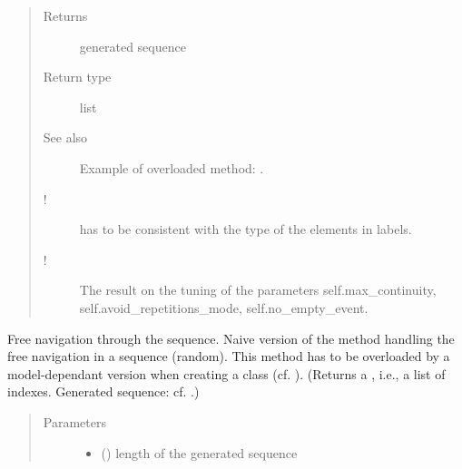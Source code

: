 \documentclass[letterpaper,10pt,english]{sphinxmanual}
\begin{document}
\begin{fulllineitems}
\begin{fulllineitems}
\begin{quote}
\begin{description}
\begin{itemize}
\end{itemize}

\item[{Returns}] \leavevmode
generated sequence

\item[{Return type}] \leavevmode
list

\item[{See also}] \leavevmode
Example of overloaded method: .

\item[{!}] \leavevmode
{} has to be consistent with the type of the elements in labels.

\item[{!}] \leavevmode
The result  on the tuning of the parameters self.max\_continuity, self.avoid\_repetitions\_mode, self.no\_empty\_event.

\end{description}\end{quote}

\end{fulllineitems}


\begin{fulllineitems}
\label{\detokenize{index:Navigator.Navigator.free_navigation}}
Free navigation through the sequence. 
Naive version of the method handling the free navigation in a sequence (random). 
This method has to be overloaded by a model-dependant version when creating a  class (cf. ).
(Returns a , i.e., a list of indexes. Generated sequence: cf. {\hyperref[\detokenize{index:Navigator.Navigator.free_generation}]{}}.)
\begin{quote}\begin{description}
\item[{Parameters}] \leavevmode\begin{itemize}
\item {} 
 () \textendash{} length of the generated sequence


\end{itemize}
\end{description}
\end{quote}
\end{fulllineitems}
\end{fulllineitems}
\end{document}
